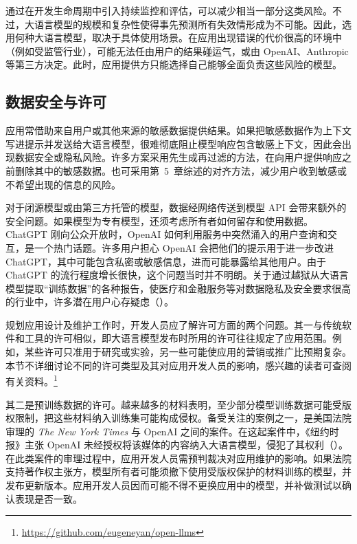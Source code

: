 通过在开发生命周期中引入持续监控和评估，可以减少相当一部分这类风险。不过，大语言模型的规模和复杂性使得事先预测所有失效情形成为不可能。因此，选用何种大语言模型，取决于具体使用场景。在应用出现错误的代价很高的环境中（例如受监管行业），可能无法任由用户的结果碰运气，或由 OpenAI、Anthropic 等第三方决定。此时，应用提供方只能选择自己能够全面负责这些风险的模型。

\subsection{数据安全与许可}
应用常借助来自用户或其他来源的敏感数据提供结果。如果把敏感数据作为上下文写进提示并发送给大语言模型，很难彻底阻止模型响应包含敏感上下文，因此会出现数据安全或隐私风险。许多方案采用先生成再过滤的方法，在向用户提供响应之前删除其中的敏感数据。也可采用第~5~章综述的对齐方法，减少用户收到敏感或不希望出现的信息的风险。

对于闭源模型或由第三方托管的模型，数据经网络传送到模型 API 会带来额外的安全问题。如果模型为专有模型，还须考虑所有者如何留存和使用数据。ChatGPT 刚向公众开放时，OpenAI 如何利用服务中突然涌入的用户查询和交互，是一个热门话题。许多用户担心 OpenAI 会把他们的提示用于进一步改进 ChatGPT，其中可能包含私密或敏感信息，进而可能暴露给其他用户。由于 ChatGPT 的流行程度增长很快，这个问题当时并不明朗。关于通过越狱从大语言模型提取“训练数据”的各种报告，使医疗和金融服务等对数据隐私及安全要求很高的行业中，许多潜在用户心存疑虑（）。

规划应用设计及维护工作时，开发人员应了解许可方面的两个问题。其一与传统软件和工具的许可相似，即大语言模型发布时所用的许可往往规定了应用范围。例如，某些许可只准用于研究或实验，另一些可能使应用的营销或推广比预期复杂。本节不详细讨论不同的许可类型及其对应用开发人员的影响，感兴趣的读者可查阅有关资料。\footnote{\url{https://github.com/eugeneyan/open-llms}}

其二是预训练数据的许可。越来越多的材料表明，至少部分模型训练数据可能受版权限制，把这些材料纳入训练集可能构成侵权。备受关注的案例之一，是美国法院审理的 \textit{The New York Times} 与 OpenAI 之间的案件。在这起案件中，《纽约时报》主张 OpenAI 未经授权将该媒体的内容纳入大语言模型，侵犯了其权利（）。在此类案件的审理过程中，应用开发人员需预判裁决对应用维护的影响。如果法院支持著作权主张方，模型所有者可能须撤下使用受版权保护的材料训练的模型，并发布更新版本。应用开发人员因而可能不得不更换应用中的模型，并补做测试以确认表现是否一致。
